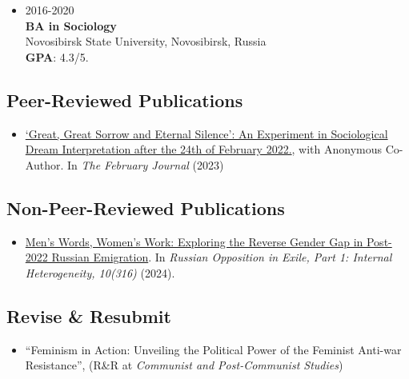 \documentclass[
]{article}
\providecommand{\tightlist}{%
  \setlength{\itemsep}{0pt}\setlength{\parskip}{0pt}}
\begin{document}
\begin{itemize}
\tightlist
\item
  2016-2020\\
  \textbf{BA in Sociology}\\
  Novosibirsk State University, Novosibirsk, Russia\\
  \textbf{GPA}: 4.3/5.
\end{itemize}

\hypertarget{peer-reviewed-publications}{%
\subsection{Peer-Reviewed
Publications}\label{peer-reviewed-publications}}

\begin{itemize}
\tightlist
\item
  \href{https://thefebruaryjournal.org/index.php/tfj/article/view/67}{`Great,
  Great Sorrow and Eternal Silence': An Experiment in Sociological Dream
  Interpretation after the 24th of February 2022.}, with Anonymous
  Co-Author. In \emph{The February Journal} (2023)
\end{itemize}

\hypertarget{non-peer-reviewed-publications}{%
\subsection{Non-Peer-Reviewed
Publications}\label{non-peer-reviewed-publications}}

\begin{itemize}
\tightlist
\item
  \href{https://www.research-collection.ethz.ch/handle/20.500.11850/692533}{Men's
  Words, Women's Work: Exploring the Reverse Gender Gap in Post-2022
  Russian Emigration}. In \emph{Russian Opposition in Exile, Part 1:
  Internal Heterogeneity, 10(316)} (2024).
\end{itemize}

\hypertarget{revise-resubmit}{%
\subsection{Revise \& Resubmit}\label{revise-resubmit}}

\begin{itemize}
\tightlist
\item
  ``Feminism in Action: Unveiling the Political Power of the Feminist
  Anti-war Resistance'', (R\&R at \emph{Communist and Post-Communist
  Studies})
\end{itemize}
\end{document}
